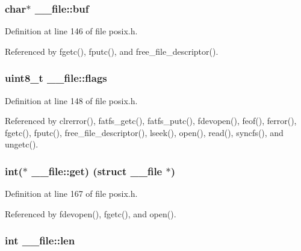 \subsubsection[{\texorpdfstring{buf}{buf}}]{\setlength{\rightskip}{0pt plus 5cm}char$\ast$ \+\_\+\+\_\+file\+::buf}\hypertarget{struct____file_a3e5a85ae919a90efbb7cb44ccb54fe46}{}\label{struct____file_a3e5a85ae919a90efbb7cb44ccb54fe46}


Definition at line 146 of file posix.\+h.



Referenced by fgetc(), fputc(), and free\+\_\+file\+\_\+descriptor().

\subsubsection[{\texorpdfstring{flags}{flags}}]{\setlength{\rightskip}{0pt plus 5cm}uint8\+\_\+t \+\_\+\+\_\+file\+::flags}\hypertarget{struct____file_a8d11df8679502efee09740f97d7c277b}{}\label{struct____file_a8d11df8679502efee09740f97d7c277b}


Definition at line 148 of file posix.\+h.



Referenced by clrerror(), fatfs\+\_\+getc(), fatfs\+\_\+putc(), fdevopen(), feof(), ferror(), fgetc(), fputc(), free\+\_\+file\+\_\+descriptor(), lseek(), open(), read(), syncfs(), and ungetc().

\subsubsection[{\texorpdfstring{get}{get}}]{\setlength{\rightskip}{0pt plus 5cm}int($\ast$ \+\_\+\+\_\+file\+::get) (struct {\bf \+\_\+\+\_\+file} $\ast$)}\hypertarget{struct____file_a2d816b077c3af0425344fe4b283dad33}{}\label{struct____file_a2d816b077c3af0425344fe4b283dad33}


Definition at line 167 of file posix.\+h.



Referenced by fdevopen(), fgetc(), and open().

\subsubsection[{\texorpdfstring{len}{len}}]{\setlength{\rightskip}{0pt plus 5cm}int \+\_\+\+\_\+file\+::len}\hypertarget{struct____file_a30309efd13a75ed510bb2370debafaf8}{}\label{struct____file_a30309efd13a75ed510bb2370debafaf8}


